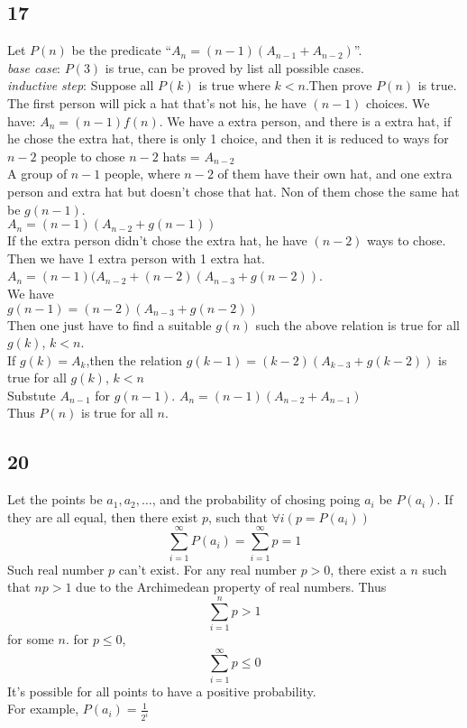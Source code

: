 \documentclass[letter]{article}
\begin{document}
\subsection*{17}
Let $P(n)$ be the predicate ``$A_n = (n-1)(A_{n-1}+A_{n-2})$''.\\
\emph{base case}: $P(3)$ is true, can be proved by list all possible cases.\\
\emph{inductive step}: Suppose all $P(k)$ is true where $k<n$.Then prove $P(n)$ is true.\\
The first person will pick a hat that's not his, he have $(n-1)$ choices. We have:
$A_n = (n-1)f(n)$.
We have a extra person, and there is a extra hat, if he chose the extra hat, there is only 1 choice, and then it is reduced to ways for $n-2$ people to chose $n-2$ hats = $A_{n-2}$\\
A group of $n-1$ people, where $n-2$ of them have their own hat, and one extra person and extra hat but doesn't chose that hat. Non of them chose the same hat be $g(n-1)$.\\
$A_n = (n-1)(A_{n-2} + g(n-1))$\\
If the extra person didn't chose the extra hat, he have $(n-2)$ ways to chose. Then we have 1 extra person with 1 extra hat.\\
$A_n = (n-1)(A_{n-2} + (n-2)(A_{n-3}+g(n-2))$.\\
We have\\
$g(n-1) = (n-2)(A_{n-3}+g(n-2))$\\
Then one just have to find a suitable $g(n)$ such the above relation is true for all $g(k)$, $k<n$.\\
If $g(k) = A_{k}$,then the relation $g(k-1) = (k-2)(A_{k-3}+g(k-2))$ is true for all $g(k)$, $k<n$\\
Substute $A_{n-1}$ for $g(n-1)$. $A_n = (n-1)(A_{n-2} + A_{n-1})$\\
Thus $P(n)$ is true for all $n$.


\subsection*{20}
Let the points be $a_1,a_2,\ldots$, and the probability of chosing poing $a_i$ be $P(a_i)$. If they are all equal, then there exist $p$, such that $\forall i(p = P(a_i))$
\[\sum_{i=1}^\infty P(a_i) = \sum_{i=1}^\infty p = 1\]
Such real number $p$ can't exist. For any real number $p>0$, there exist a $n$ such that $np>1$ due to the Archimedean property of real numbers. Thus \[\sum_{i=1}^n p > 1\] for some $n$. for $p\leq 0$, \[\sum_{i=1}^\infty p \leq 0\]
It's possible for all points to have a positive probability.\\
For example, $P(a_i) = \frac{1}{2^i}$
\end{document}
